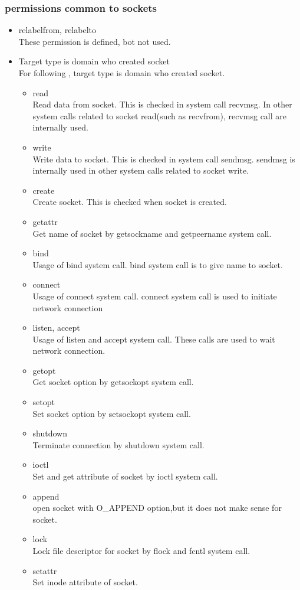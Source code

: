 \documentclass{article}
\begin{document}
\subsubsection{permissions common to sockets}\label{sec:commonsock}
\begin{itemize}
 \item relabelfrom, relabelto\\
       These permission is defined, bot not used.

 \item Target type is domain who created socket \\
       For following , target type is domain who created socket. 
 \begin{itemize}
  \item   read\\
	  Read data from socket. This is checked in system call
	  recvmsg. In other system calls related to socket read(such as recvfrom), recvmsg
	  call are internally used.
  \item  write\\
	  Write data to socket. This is checked in system call
	  sendmsg. sendmsg is internally used in other system calls
	  related to socket write.
  \item  create\\
	  Create socket. This is checked when socket is created.
  \item  getattr\\
	  Get name of socket by  getsockname and getpeername system call.
	  
  \item  bind\\
	  Usage of bind system call. bind system call is to give name to
	  socket.
  \item  connect\\
	  Usage of connect system call. connect system call is used to
	  initiate network connection
  \item  listen, accept\\
	  Usage of listen and accept system call. These calls are used to
	  wait network connection.
  \item  getopt\\
	  Get socket option by getsockopt system call.
  \item  setopt\\
	  Set socket option by setsockopt system call.
  \item  shutdown\\
	  Terminate connection by shutdown system call.
  \item ioctl\\
	  Set and get attribute of socket by ioctl system call.
  \item append\\
	  open socket with O\_APPEND option,but it does not make sense
	  for socket.
  \item lock\\
	  Lock file descriptor for socket by flock and fcntl system call.
  \item setattr\\
	  Set inode attribute of socket.
 \end{itemize}


\end{itemize}
\end{document}
